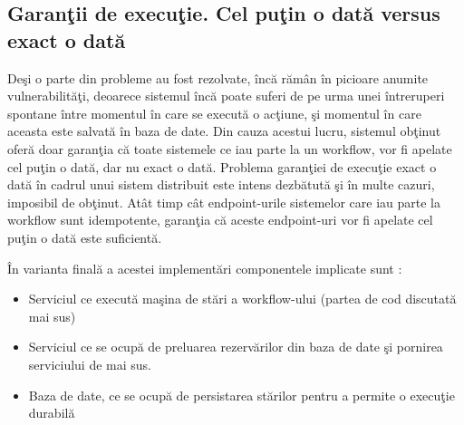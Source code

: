 \subsection{Garanţii de execuţie. Cel puţin o dată versus exact o dată}
\par Deşi o parte din probleme au fost rezolvate, încă rămân în picioare anumite vulnerabilităţi, deoarece sistemul încă poate suferi de pe urma unei întreruperi spontane între momentul în care se execută o acţiune, şi momentul în care aceasta este salvată în baza de date. Din cauza acestui lucru, sistemul obţinut oferă doar garanţia că toate sistemele ce iau parte la un workflow, vor fi apelate cel puţin o dată, dar nu exact o dată. Problema garanţiei de execuţie exact o dată în cadrul unui sistem distribuit este intens dezbătută şi în multe cazuri, imposibil de obţinut. Atât timp cât endpoint-urile sistemelor care iau parte la workflow sunt idempotente, garanţia că aceste endpoint-uri vor fi apelate cel puţin o dată este suficientă.
\par În varianta finală a acestei implementări componentele implicate sunt : 
\begin{itemize}
\item Serviciul ce execută maşina de stări a workflow-ului (partea de cod discutată mai sus)
\item Serviciul ce se ocupă de preluarea rezervărilor din baza de date şi pornirea serviciului de mai sus.
\item Baza de date, ce se ocupă de persistarea stărilor pentru a permite o execuţie durabilă
\end{itemize}
